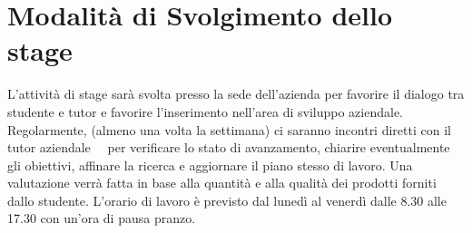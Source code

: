 \section*{Modalità di Svolgimento dello stage}
L’attività di stage sarà svolta presso la sede dell’azienda per favorire il dialogo tra studente e tutor e favorire l’inserimento nell’area di sviluppo aziendale.
Regolarmente, (almeno una volta la settimana) ci saranno incontri diretti con il tutor aziendale \nomeTutorAziendale\ \cognomeTutorAziendale\ per verificare lo stato di avanzamento, chiarire eventualmente gli obiettivi, affinare la ricerca e aggiornare il piano stesso di lavoro.
Una valutazione verrà fatta in base alla quantità e alla qualità dei prodotti forniti dallo studente.
L’orario di lavoro è previsto dal lunedì al venerdì dalle 8.30 alle 17.30 con un’ora di pausa pranzo.